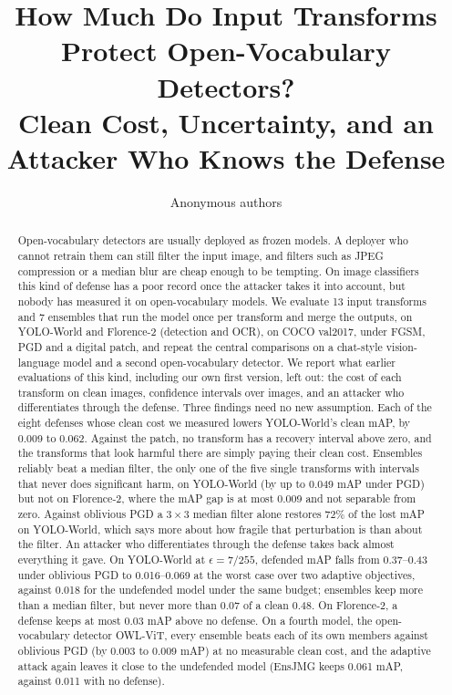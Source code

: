 \documentclass[11pt]{article}
\title{How Much Do Input Transforms Protect Open-Vocabulary Detectors?\\
Clean Cost, Uncertainty, and an Attacker Who Knows the Defense}
\author{Anonymous authors}
\date{}
\newcommand{\yw}{YOLO-World}
\newcommand{\fl}{Florence-2}
\begin{document}
\maketitle

\begin{abstract}
Open-vocabulary detectors are usually deployed as frozen models. A deployer
who cannot retrain them can still filter the input image, and filters such as
JPEG compression or a median blur are cheap enough to be tempting. On image
classifiers this kind of defense has a poor record once the attacker takes it
into account, but nobody has measured it on open-vocabulary models. We
evaluate 13 input transforms and 7 ensembles that run the model once per
transform and merge the outputs, on \yw{} and \fl{} (detection and OCR), on
COCO val2017, under FGSM, PGD and a digital patch, and repeat the central
comparisons on a chat-style vision-language model and a second
open-vocabulary detector. We report what earlier
evaluations of this kind, including our own first version, left out: the cost
of each transform on clean images, confidence intervals over images, and an
attacker who differentiates through the defense. Three findings need no new
assumption. Each of the eight defenses whose clean cost we measured lowers
\yw{}'s clean mAP, by 0.009 to 0.062. Against the patch, no transform has a
recovery interval above zero, and the transforms that look harmful there are
simply paying their clean cost. Ensembles reliably beat a median filter, the
only one of the five single transforms with intervals that never does
significant harm, on \yw{} (by up to
0.049 mAP under PGD) but not on \fl{}, where the mAP gap is at most 0.009 and
not separable from zero. Against oblivious PGD a $3\times3$ median filter alone
restores 72\% of the lost mAP on \yw{}, which says more about how fragile
that perturbation is than about the filter. An attacker who differentiates
through the defense takes back almost everything it gave. On \yw{} at
$\epsilon=7/255$, defended
mAP falls from 0.37--0.43 under oblivious PGD to 0.016--0.069 at the worst
case over two adaptive objectives, against 0.018 for the undefended model
under the same budget; ensembles keep more than a median filter, but never
more than 0.07 of a clean 0.48. On \fl{}, a defense keeps at most 0.03 mAP
above no defense. On a fourth model, the open-vocabulary detector OWL-ViT,
every ensemble beats each of its own members against oblivious PGD (by 0.003
to 0.009 mAP) at no measurable clean cost, and the adaptive attack again
leaves it close to the undefended model (EnsJMG keeps 0.061 mAP, against
0.011 with no defense).
\end{abstract}
\end{document}
